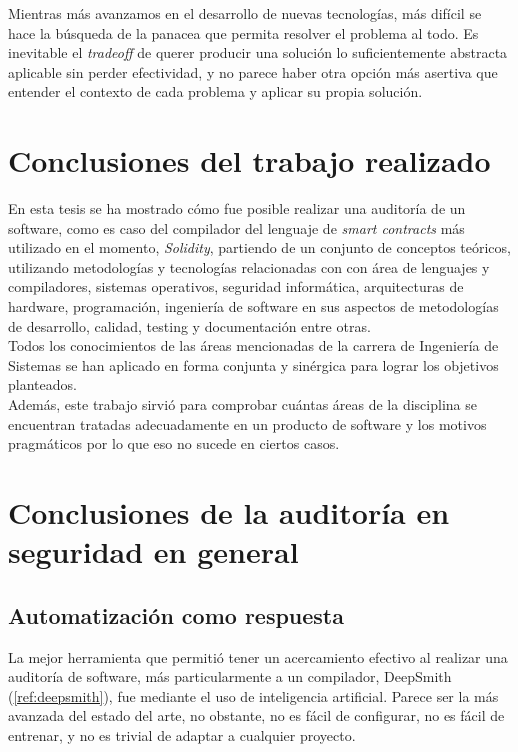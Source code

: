 Mientras más avanzamos en el desarrollo de nuevas tecnologías, más difícil se hace la búsqueda de la panacea que permita resolver el problema al todo. Es inevitable el \textit{tradeoff} de querer producir una solución lo suficientemente abstracta aplicable sin perder efectividad, y no parece haber otra opción más asertiva que entender el contexto de cada problema y aplicar su propia solución.

\section{Conclusiones del trabajo realizado} 
En esta tesis se ha mostrado cómo fue posible realizar una auditoría de un software, como es caso del compilador del lenguaje de \textit{smart contracts} más utilizado en el momento, \textit{Solidity}, partiendo de un conjunto de conceptos teóricos, utilizando metodologías y tecnologías relacionadas con con área de lenguajes y compiladores, sistemas operativos, seguridad informática, arquitecturas de hardware, programación, ingeniería de software en sus aspectos de metodologías de desarrollo, calidad, testing y documentación entre otras.\\

Todos los conocimientos de las áreas mencionadas de la carrera de Ingeniería de Sistemas se han aplicado en forma conjunta y sinérgica para lograr los objetivos planteados.\\

Además, este trabajo sirvió para comprobar cuántas áreas de la disciplina se encuentran tratadas adecuadamente en un producto de software y los motivos pragmáticos por lo que eso no sucede en ciertos casos.\\

\section{Conclusiones de la auditoría en seguridad en general}

\subsection{Automatización como respuesta}
La mejor herramienta que permitió tener un acercamiento efectivo al realizar una auditoría de software, más particularmente a un compilador, DeepSmith (\ref{ref:deepsmith}), fue mediante el uso de inteligencia artificial. Parece ser la más avanzada del estado del arte, no obstante, no es fácil de configurar, no es fácil de entrenar, y no es trivial de adaptar a cualquier proyecto.\\

